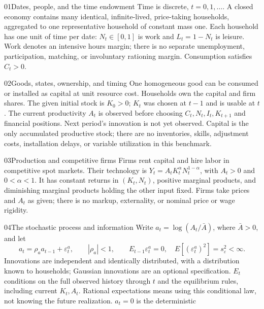 \begin{modelsetup}[1]
\begin{modelcondition}{01}{Dates, people, and the time endowment}
Time is discrete, $t=0,1,\ldots$. A closed economy contains many identical,
infinite-lived, price-taking households, aggregated to one representative
household of constant mass one. Each household has one unit of time per date:
$N_t\in[0,1]$ is work and $L_t=1-N_t$ is leisure. Work denotes an intensive
hours margin; there is no separate unemployment, participation, matching, or
involuntary rationing margin. Consumption satisfies $C_t>0$.
\end{modelcondition}
\begin{modelcondition}{02}{Goods, states, ownership, and timing}
One homogeneous good can be consumed or installed as capital at unit resource
cost. Households own the capital and firm shares. The given initial stock is
$K_0>0$; $K_t$ was chosen at $t-1$ and is usable at $t$. The current productivity
$A_t$ is observed before choosing $C_t,N_t,I_t,K_{t+1}$ and financial positions.
Next period's innovation is not yet observed. Capital is the only accumulated
productive stock; there are no inventories, skills, adjustment costs,
installation delays, or variable utilization in this benchmark.
\end{modelcondition}
\begin{modelcondition}{03}{Production and competitive firms}
Firms rent capital and hire labor in competitive spot markets. Their technology
is $Y_t=A_tK_t^\alpha N_t^{1-\alpha}$, with $A_t>0$ and $0<\alpha<1$.
It has constant returns in $(K_t,N_t)$, positive marginal products, and diminishing
marginal products holding the other input fixed. Firms take prices and $A_t$
as given; there is no markup, externality, or nominal price or wage rigidity.
\end{modelcondition}
\begin{modelcondition}{04}{The stochastic process and information}
Write $a_t=\log(A_t/\bar A)$, where $\bar A>0$, and let
\[
a_t=\rho_a a_{t-1}+\varepsilon_t^a,\qquad |\rho_a|<1,\qquad
E_{t-1}\varepsilon_t^a=0,\quad E[(\varepsilon_t^a)^2]=s_\varepsilon^2<\infty.
\]
Innovations are independent and identically distributed, with a distribution
known to households; Gaussian innovations are an optional specification.
$E_t$ conditions on the full observed history through $t$ and the equilibrium
rules, including current $K_t,A_t$. Rational expectations means using this
conditional law, not knowing the future realization. $a_t=0$ is the deterministic

\end{modelcondition}
\end{modelsetup}
